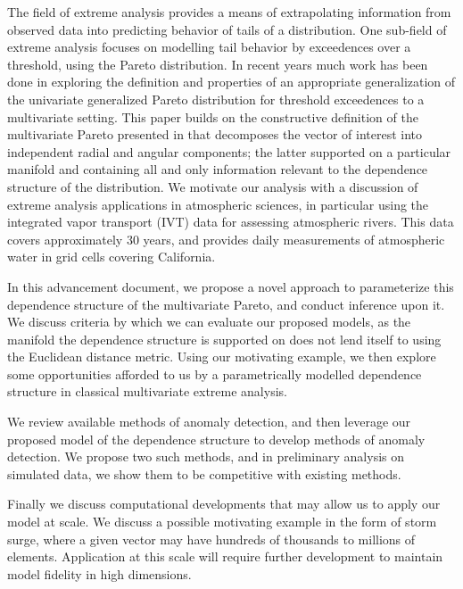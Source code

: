 
The field of extreme analysis provides a means of extrapolating information from observed data into
  predicting behavior of tails of a distribution.  One sub-field of extreme analysis focuses on modelling 
  tail behavior by exceedences over a threshold, using the Pareto distribution.  In recent years much 
  work has been done in exploring the definition and properties of an appropriate generalization of the
  univariate generalized Pareto distribution for threshold exceedences to a multivariate setting.  This 
  paper builds on the constructive definition of the multivariate Pareto presented in \cite{ferreira2014}
  that decomposes the vector of interest into independent radial and angular components; the latter 
  supported on a particular manifold and containing all and only information relevant to the dependence
  structure of the distribution.  We motivate our analysis with a discussion of extreme analysis applications
  in atmospheric sciences, in particular using the integrated vapor transport (IVT) data for assessing
  atmospheric rivers.  This data covers approximately 30 years, and provides daily measurements of atmospheric water in grid cells covering California.

In this advancement document, we propose a novel approach to parameterize this dependence structure of 
  the multivariate Pareto, and conduct inference upon it.  We discuss criteria by which we can evaluate our
  proposed models, as the manifold the dependence structure is supported on does not lend itself to using the
  Euclidean distance metric.  Using our motivating example, we then explore some opportunities afforded to 
  us by a parametrically  modelled dependence structure in classical multivariate extreme analysis.
  
We review available methods of anomaly detection, and then leverage our proposed model of the dependence
  structure to develop methods of anomaly detection.  We propose two such methods, and in preliminary 
  analysis on simulated data, we show them to be competitive with existing methods.
  
Finally we discuss computational developments that may allow us to apply our model at scale.  We discuss a
  possible motivating example in the form of storm surge, where a given vector may have hundreds of 
  thousands to millions of elements.  Application at this scale will require further development to
  maintain model fidelity in high dimensions.
 
